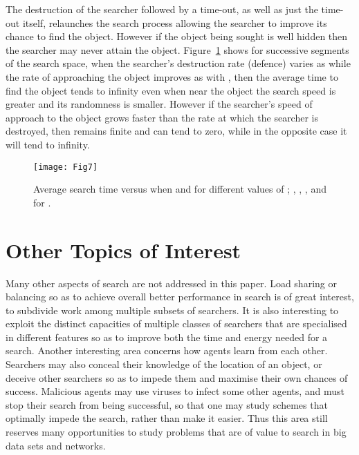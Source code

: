 \documentclass[journal]{IEEEtran}
\begin{document}
The destruction of the searcher followed by a time-out, as well as just the time-out itself,  relaunches the search process allowing the searcher to improve its chance to find the object. However if the object being sought is well hidden then the searcher may never attain the object. Figure~\ref{fig7} shows for successive segments  of the search space, when the searcher's destruction rate (defence) varies as   while the rate of approaching the object improves
as   with , then the average time  to find the object tends to infinity even when near the object the search speed is greater and its randomness is smaller. However if  the searcher's speed of approach to the object grows faster than the rate at which the searcher is  destroyed, then  remains finite and can tend to zero, while in the opposite case it will tend to infinity.

\begin{figure}[t]\centering
\texttt{[image: Fig7]}
\caption{ \label{fig7} Average search time  versus  when  and  for different values of ; , , ,  and  for .}
\end{figure}

\section{Other Topics of Interest}

Many other aspects of search are not addressed in this paper. Load sharing or balancing so as to achieve overall better performance in search is of great interest, to subdivide work among multiple subsets of searchers. It is also interesting to exploit the distinct capacities of multiple classes of searchers that are specialised in different features so as to improve both the time and energy needed for a search.
Another interesting area concerns how agents learn from each other. Searchers may also  conceal their knowledge of the location of an object, or deceive other searchers so as to impede them and maximise their own chances of success. Malicious agents may use viruses \cite{Viruses} to infect some other agents, and must stop their search from being successful, so that one may study schemes that optimally impede the search, rather than make it easier.
Thus this area still reserves many opportunities to study problems that are of value to search in big data sets and networks.
\end{document}
